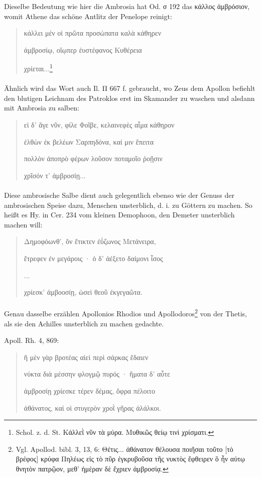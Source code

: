 \documentclass[a4paper, 11pt, oneside]{article}
\begin{document}
Dieselbe Bedeutung wie hier die Ambrosia hat Od. σ 192 das κάλλος ἀμβρόσιον, womit Athene das schöne Antlitz der Penelope reinigt:
\begin{quotation}
κάλλει μέν οἰ πρῶτα προσώπατα καλὰ κάθηρεν

ἀμβροσίῳ, οἴῳπερ ἐυστέφανος Κυθέρεια

χρίεται...\footnote{Schol. z. d. St. Κάλλεῒ νῦν τὰ μύρα. Μυθικῶς θείῳ τινὶ χρίσματι.}
\end{quotation}
\paragraph{}
Ähnlich wird das Wort auch Il. Π 667 f. gebraucht, wo Zeus dem Apollon befiehlt den blutigen Leichnam des Patroklos erst im Skamander zu waschen und alsdann mit Ambrosia zu salben:
\begin{quotation}
εἰ δ' ἄγε νῦν, φίλε Φοῖβε, κελαινεφὲς αἷμα κάθηρον

ἐλθὼν ἐκ βελέων Σαρπηδόνα, καί μιν ἔπειτα

πολλὸν ἀποπρὸ φέρων λοῦσον ποταμοῖο ῥοῇσιν

χρῖσόν τ' ἀμβροσίῃ...
\end{quotation}
\paragraph{}
Diese ambrosische Salbe dient auch gelegentlich ebenso wie der Genuss der ambrosischen Speise dazu, Menschen unsterblich, d. i. zu Göttern zu machen. So heißt es Hy. in Cer. 234 vom kleinen Demophoon, den Demeter unsterblich machen will:
\begin{quotation}
Δημοφόωνθ', ὃν ἔτικτεν ἐΰζωνος Μετάνειρα,

ἔτρεφεν ἐν μεγάροις · ὁ δ' ἀέξετο δαίμονι ἶσος

...

χρίεσκ' ἀμβοοσίῃ, ὡσεὶ θεοῦ ἐκγεγαῶτα.
\end{quotation}
\paragraph{}
Genau dasselbe erzählen Apollonios Rhodios und Apollodoros\footnote{Vgl. Apollod. bibl. 3, 13, 6: Θέτις... ἀθάνατον θέλουσα ποιῆσαι τοῦτο [τὸ βρέφος] κρύφα Πηλέως εἰς τὸ πῦρ ἐγκρυβοῦσα τῆς νυκτὸς ἔφθειρεν ὃ ἦν αὐτῳ θνητὸν πατρῷον, μεθ' ἡμέραν δὲ ἔχριεν ἀμβροσίᾳ.} von der Thetis, als sie den Achilles unsterblich zu machen gedachte.

Apoll. Rh. 4, 869:
\begin{quotation}
ἢ μὲν γὰρ βροτέας αἰεὶ περὶ σάρκας ἔδαιεν

νύκτα διὰ μέσσην φλογμῷ πυρός · ἥματα δ' αὖτε

ἀμβροσίῃ χρίεσκε τέρεν δέμας, ὄφρα πέλοιτο

ἀθάνατος, καί οἱ στυγερὸν χροῒ γῆρας ἀλάλκοι.
\end{quotation}
\end{document}
